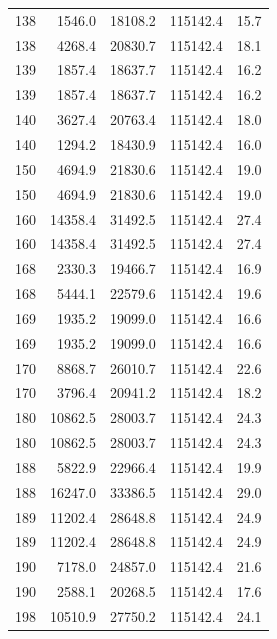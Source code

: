 \begin{longtable}{rrrrr}
    138 & \num{1546.0} & \num{18108.2} & \num{115142.4} & 15.7 \\
    138 & \num{4268.4} & \num{20830.7} & \num{115142.4} & 18.1 \\
    139 & \num{1857.4} & \num{18637.7} & \num{115142.4} & 16.2 \\
    139 & \num{1857.4} & \num{18637.7} & \num{115142.4} & 16.2 \\
    140 & \num{3627.4} & \num{20763.4} & \num{115142.4} & 18.0 \\
    140 & \num{1294.2} & \num{18430.9} & \num{115142.4} & 16.0 \\
    150 & \num{4694.9} & \num{21830.6} & \num{115142.4} & 19.0 \\
    150 & \num{4694.9} & \num{21830.6} & \num{115142.4} & 19.0 \\
    160 & \num{14358.4} & \num{31492.5} & \num{115142.4} & 27.4 \\
    160 & \num{14358.4} & \num{31492.5} & \num{115142.4} & 27.4 \\
    168 & \num{2330.3} & \num{19466.7} & \num{115142.4} & 16.9 \\
    168 & \num{5444.1} & \num{22579.6} & \num{115142.4} & 19.6 \\
    169 & \num{1935.2} & \num{19099.0} & \num{115142.4} & 16.6 \\
    169 & \num{1935.2} & \num{19099.0} & \num{115142.4} & 16.6 \\
    170 & \num{8868.7} & \num{26010.7} & \num{115142.4} & 22.6 \\
    170 & \num{3796.4} & \num{20941.2} & \num{115142.4} & 18.2 \\
    180 & \num{10862.5} & \num{28003.7} & \num{115142.4} & 24.3 \\
    180 & \num{10862.5} & \num{28003.7} & \num{115142.4} & 24.3 \\
    188 & \num{5822.9} & \num{22966.4} & \num{115142.4} & 19.9 \\
    188 & \num{16247.0} & \num{33386.5} & \num{115142.4} & 29.0 \\
    189 & \num{11202.4} & \num{28648.8} & \num{115142.4} & 24.9 \\
    189 & \num{11202.4} & \num{28648.8} & \num{115142.4} & 24.9 \\
    190 & \num{7178.0} & \num{24857.0} & \num{115142.4} & 21.6 \\
    190 & \num{2588.1} & \num{20268.5} & \num{115142.4} & 17.6 \\
    198 & \num{10510.9} & \num{27750.2} & \num{115142.4} & 24.1 \\

\end{longtable}
